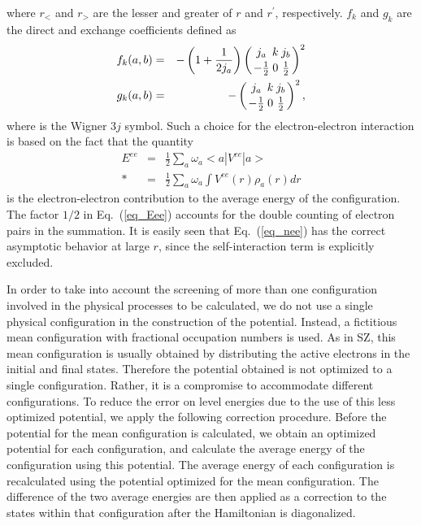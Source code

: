 where $r_<$ and $r_>$ are the lesser and greater of $r$ and $r^\prime$,
respectively. $f_k$ and $g_k$ are the direct and exchange coefficients defined
as
\begin{eqnarray}
\label{eq_fg}
f_k(a,b) &=& -\left(1+\frac{1}{2j_a}\right)
\threej{j_a}{k}{j_b}{-\frac{1}{2}}{0}{\frac{1}{2}}^2 \nonumber\\*
g_k(a,b) &=& -\threej{j_a}{k}{j_b}{-\frac{1}{2}}{0}{\frac{1}{2}}^2,
\end{eqnarray}
where  is the Wigner $3j$ symbol. Such a
choice for the electron-electron interaction is based on the fact that the
quantity 
\begin{eqnarray}
\label{eq_Eee}
E^{ee} &=& \frac{1}{2}\sum_a\omega_a<a|V^{ee}|a> \nonumber\\*
&=& \frac{1}{2}\sum_a\omega_a\int V^{ee}(r)\rho_a(r)d r
\end{eqnarray}
is the electron-electron contribution to the average energy of the
configuration. The factor $1/2$ in Eq.~(\ref{eq_Eee}) accounts for the
double counting of electron pairs in the summation. It is easily seen
that Eq.~(\ref{eq_nee}) has the correct asymptotic behavior at large $r$,
since the self-interaction term is explicitly excluded.

In order to take into account the screening of more than one configuration
involved in the physical processes to be calculated, we do not use a single
physical configuration in the construction of the potential. Instead, a
fictitious mean configuration with fractional occupation numbers is used. As
in SZ, this mean configuration is usually obtained by distributing the active
electrons in the initial and final states. Therefore the potential obtained is
not optimized to a single configuration. Rather, it is a compromise to
accommodate different configurations. To reduce the error on level
energies due to the use of this less optimized potential, we apply the 
following correction procedure. Before the potential for the mean
configuration is calculated, we obtain an optimized potential for each
configuration, and calculate the average energy of the configuration using
this potential. The average energy of each configuration is recalculated using
the potential optimized for the mean configuration. The difference of the two
average energies are then applied as a correction to the states within that
configuration after the Hamiltonian is diagonalized.

